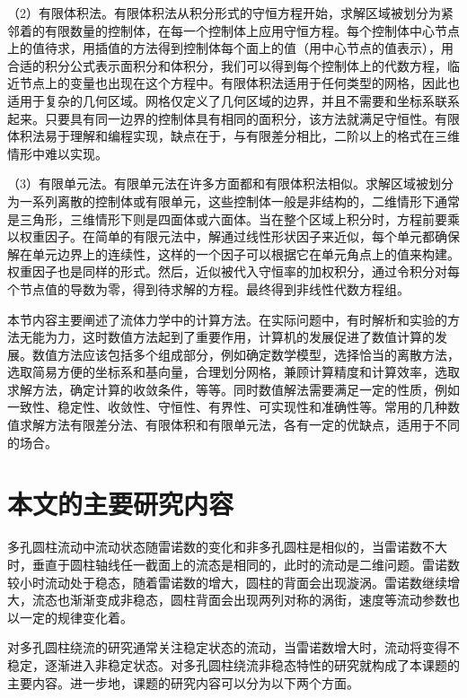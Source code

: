 （2）有限体积法。有限体积法从积分形式的守恒方程开始，求解区域被划分为紧邻着的有限数量的控制体，在每一个控制体上应用守恒方程。每个控制体中心节点上的值待求，用插值的方法得到控制体每个面上的值（用中心节点的值表示），用合适的积分公式表示面积分和体积分，我们可以得到每个控制体上的代数方程，临近节点上的变量也出现在这个方程中。有限体积法适用于任何类型的网格，因此也适用于复杂的几何区域。网格仅定义了几何区域的边界，并且不需要和坐标系联系起来。只要具有同一边界的控制体具有相同的面积分，该方法就满足守恒性。有限体积法易于理解和编程实现，缺点在于，与有限差分相比，二阶以上的格式在三维情形中难以实现。

（3）有限单元法。有限单元法在许多方面都和有限体积法相似。求解区域被划分为一系列离散的控制体或有限单元，这些控制体一般是非结构的，二维情形下通常是三角形，三维情形下则是四面体或六面体。当在整个区域上积分时，方程前要乘以权重因子。在简单的有限元法中，解通过线性形状因子来近似，每个单元都确保解在单元边界上的连续性，这样的一个因子可以根据它在单元角点上的值来构建。权重因子也是同样的形式。然后，近似被代入守恒率的加权积分，通过令积分对每个节点值的导数为零，得到待求解的方程。最终得到非线性代数方程组。%

本节内容主要阐述了流体力学中的计算方法。在实际问题中，有时解析和实验的方法无能为力，这时数值方法起到了重要作用，计算机的发展促进了数值计算的发展。数值方法应该包括多个组成部分，例如确定数学模型，选择恰当的离散方法，选取简易方便的坐标系和基向量，合理划分网格，兼顾计算精度和计算效率，选取求解方法，确定计算的收敛条件，等等。同时数值解法需要满足一定的性质，例如一致性、稳定性、收敛性、守恒性、有界性、可实现性和准确性等。常用的几种数值求解方法有限差分法、有限体积和有限单元法，各有一定的优缺点，适用于不同的场合。

\section{本文的主要研究内容}


多孔圆柱流动中流动状态随雷诺数的变化和非多孔圆柱是相似的，当雷诺数不大时，垂直于圆柱轴线任一截面上的流态是相同的，此时的流动是二维问题。雷诺数较小时流动处于稳态，随着雷诺数的增大，圆柱的背面会出现漩涡。雷诺数继续增大，流态也渐渐变成非稳态，圆柱背面会出现两列对称的涡街，速度等流动参数也以一定的规律变化着。

对多孔圆柱绕流的研究通常关注稳定状态的流动，当雷诺数增大时，流动将变得不稳定，逐渐进入非稳定状态。对多孔圆柱绕流非稳态特性的研究就构成了本课题的主要内容。进一步地，课题的研究内容可以分为以下两个方面。

